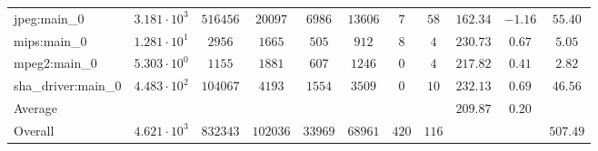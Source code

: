\begin{tabular}{|l|c|c|c|c|c|c|c|c|c|c|}
jpeg:main\_0            & $ 3.181 \cdot 10^{3}  $ & $ 516456 $ & $ 20097  $ & $ 6986  $ & $ 13606 $ & $ 7   $ & $ 58  $ & $ 162.34      $ & $ -1.16   $ & $ 55.40   $ \\
mips:main\_0            & $ 1.281 \cdot 10^{1}  $ & $ 2956   $ & $ 1665   $ & $ 505   $ & $ 912   $ & $ 8   $ & $ 4   $ & $ 230.73      $ & $ 0.67    $ & $ 5.05    $ \\
mpeg2:main\_0           & $ 5.303 \cdot 10^{0}  $ & $ 1155   $ & $ 1881   $ & $ 607   $ & $ 1246  $ & $ 0   $ & $ 4   $ & $ 217.82      $ & $ 0.41    $ & $ 2.82    $ \\
sha\_driver:main\_0     & $ 4.483 \cdot 10^{2}  $ & $ 104067 $ & $ 4193   $ & $ 1554  $ & $ 3509  $ & $ 0   $ & $ 10  $ & $ 232.13      $ & $ 0.69    $ & $ 46.56   $ \\
\hline
Average                 & $                     $ & $        $ & $        $ & $       $ & $       $ & $     $ & $     $ & $ 209.87      $ & $ 0.20    $ & $         $ \\
\hline
Overall                 & $ 4.621 \cdot 10^{3}  $ & $ 832343 $ & $ 102036 $ & $ 33969 $ & $ 68961 $ & $ 420 $ & $ 116 $ & $             $ & $         $ & $ 507.49  $ \\
\hline
\end{tabular}
